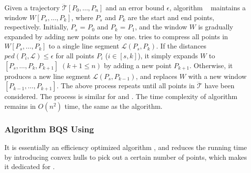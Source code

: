 Given a trajectory $\dddot{\mathcal{T}}[P_0, \ldots, P_n]$ and an error bound $\epsilon$, algorithm \opwa~\cite{Meratnia:Spatiotemporal} maintains a window $W[P_s, \ldots, P_k]$, where $P_s$ and $P_k$ are the start and end points, respectively. Initially, $P_s$ = $P_0$ and $P_k$ = $P_1$, and the window $W$ is gradually expanded by adding new points one by one. \opwa tries to compress all points in $W[P_s, \ldots, P_k]$ to a single line segment $\mathcal{L}(P_{s}, P_{k})$. If the distances $ped(P_i, {\mathcal{L}})\le \epsilon$ for all points $P_i$ ($i\in[s, k]$), it simply expands $W$ to $[P_s, \ldots, P_k, P_{k+1}]$ $(k+1\le n)$ by adding a new point $P_{k+1}$. Otherwise, it produces a new line segment $\mathcal{L}(P_{s}, P_{k-1})$, and replaces $W$ with a new window $[P_{k-1},\ldots,P_{k+1}]$.  The above process repeats until all points in $\dddot{\mathcal{T}}$ have been considered. The process is similar for \sed and \dad.
%
%
The time complexity of algorithm \opwa remains in $O(n^2)$ time, the same as the \dpa algorithm.


\subsubsection{Algorithm BQS Using \ped \cite{Liu:BQS}}
It is essentially an efficiency optimized \opwa algorithm \cite{Meratnia:Spatiotemporal}, and reduces the running time by introducing convex hulls to pick out a certain number of points, which makes it dedicated for \ped.


